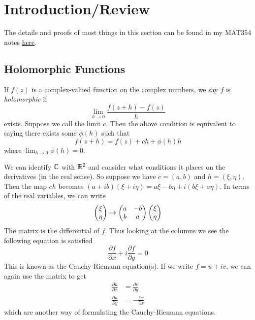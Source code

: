 \section{Introduction/Review}
The details and proofs of most things in this section can be found in my MAT354 notes \href{http://individual.utoronto.ca/rishibhp/notes/MAT354_notes.pdf}{here}.

\subsection{Holomorphic Functions}
If $f(z)$ is a complex-valued function on the complex numbers, we say $f$ is \textit{holomorphic} if
$$\lim_{h \to 0} \frac{f(z + h) - f(z)}{h}$$
exists. Suppose we call the limit $c$.
Then the above condition is equivalent to saying there exists some $\phi(h)$ such that
$$f(z + h) = f(z) + ch + \phi(h)h$$
where $\lim_{h \to 0} \phi(h) = 0$.

We can identify $\mathbb{C}$ with $\mathbb{R}^2$ and consider what conditions it places on the derivatives (in the real sense). So suppose we have $c = (a, b)$ and $h = (\xi, \eta)$. Then the map $ch$ becomes $(a + ib)(\xi + i \eta) = a\xi - b\eta + i(b \xi + a \eta)$. In terms of the real variables, we can write
$$\begin{pmatrix} \xi \\ \eta \end{pmatrix} \mapsto \begin{pmatrix} a & -b\\b & a \end{pmatrix} \begin{pmatrix} \xi \\ \eta \end{pmatrix}$$
The matrix is the differential of $f$. Thus looking at the columns we see the following equation is satisfied
$$\frac{\partial f}{\partial x} + i \frac{\partial f}{\partial y} = 0$$
This is known as the Cauchy-Riemann equation(s). If we write $f = u + iv$, we can again use the matrix to get
\begin{align*}
    \frac{\partial u}{\partial x} &= \frac{\partial v}{\partial y}\\ 
    \frac{\partial u}{\partial y} &= -\frac{\partial v}{\partial x} 
\end{align*}
which are another way of formulating the Cauchy-Riemann equations.

